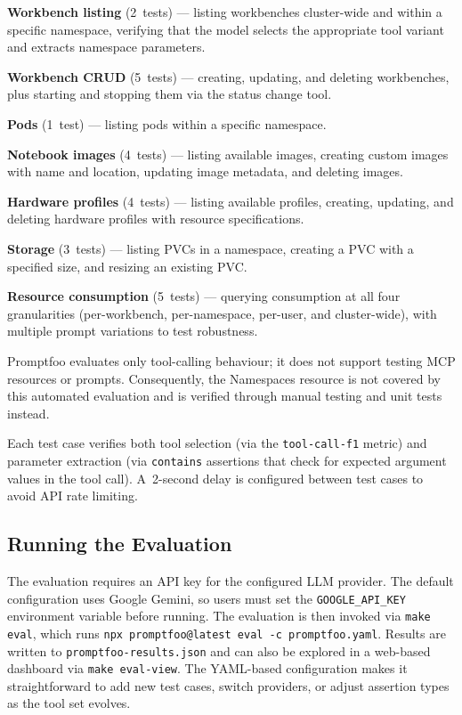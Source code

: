 \documentclass[
  digital,     %
  oneside,     %
  nosansbold,  %
  nocolorbold, %
  lof,         %
  lot,         %
]{fithesis4}
\begin{document}
\begin{compactitem}
  \item \textbf{Workbench listing} (2~tests) --- listing workbenches
        cluster-wide and within a specific namespace, verifying that the model
        selects the appropriate tool variant and extracts namespace parameters.
  \item \textbf{Workbench CRUD} (5~tests) --- creating, updating, and
        deleting workbenches, plus starting and stopping them via the status
        change tool.
  \item \textbf{Pods} (1~test) --- listing pods within a specific namespace.
  \item \textbf{Notebook images} (4~tests) --- listing available images,
        creating custom images with name and location, updating image
        metadata, and deleting images.
  \item \textbf{Hardware profiles} (4~tests) --- listing available profiles,
        creating, updating, and deleting hardware profiles with resource
        specifications.
  \item \textbf{Storage} (3~tests) --- listing PVCs in a namespace,
        creating a PVC with a specified size, and resizing an existing PVC.
  \item \textbf{Resource consumption} (5~tests) --- querying consumption
        at all four granularities (per-workbench, per-namespace, per-user,
        and cluster-wide), with multiple prompt variations to test robustness.
\end{compactitem}

Promptfoo evaluates only tool-calling behaviour; it does not support testing
MCP resources or prompts. Consequently, the Namespaces resource is not covered
by this automated evaluation and is verified through manual testing and unit
tests instead.

Each test case verifies both tool selection (via the \texttt{tool-call-f1}
metric) and parameter extraction (via \texttt{contains} assertions that
check for expected argument values in the tool call). A~2-second delay is
configured between test cases to avoid API rate limiting.

\subsection{Running the Evaluation}
\label{subsec:eval-running}

\begin{sloppypar}
The evaluation requires an API key for the configured LLM provider. The
default configuration uses Google Gemini, so users must set the
\texttt{GOOGLE\_API\_KEY} environment variable before running. The
evaluation is then invoked via \texttt{make eval}, which runs
\texttt{npx promptfoo@latest eval -c promptfoo.yaml}. Results are written
to \texttt{promptfoo-results.json} and can also be explored in a web-based
dashboard via \texttt{make eval-view}. The YAML-based configuration makes
it straightforward to add new test cases, switch providers, or adjust
assertion types as the tool set evolves.
\end{sloppypar}
\end{document}
